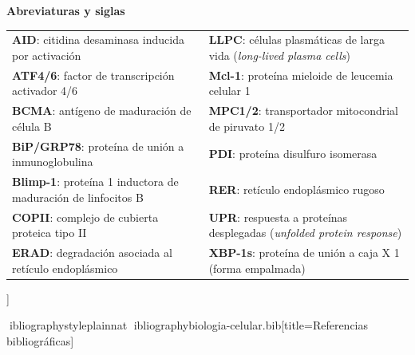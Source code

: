\documentclass[spanish,letterpaper,oneside]{article}
\begin{document}
{  {\fontsize{8.5}{10.5}\selectfont\bfseries\color{uanlblue} Abreviaturas y siglas}\\[0.04cm]
  {\fontsize{7.5}{9.5}\selectfont
  \begin{tabular*}{\textwidth}{@{\extracolsep{\fill}}ll@{}}
  \textbf{AID}: citidina desaminasa inducida por activación & \textbf{LLPC}: células plasmáticas de larga vida (\emph{long-lived plasma cells})\\
  \textbf{ATF4/6}: factor de transcripción activador 4/6 & \textbf{Mcl-1}: proteína mieloide de leucemia celular 1\\
  \textbf{BCMA}: antígeno de maduración de célula B & \textbf{MPC1/2}: transportador mitocondrial de piruvato 1/2\\
  \textbf{BiP/GRP78}: proteína de unión a inmunoglobulina & \textbf{PDI}: proteína disulfuro isomerasa\\
  \textbf{Blimp-1}: proteína 1 inductora de maduración de linfocitos B & \textbf{RER}: retículo endoplásmico rugoso\\
  \textbf{COPII}: complejo de cubierta proteica tipo II & \textbf{UPR}: respuesta a proteínas desplegadas (\emph{unfolded protein response})\\
  \textbf{ERAD}: degradación asociada al retículo endoplásmico & \textbf{XBP-1s}: proteína de unión a caja X 1 (forma empalmada)
  \end{tabular*}
  }
  \vspace{0.15cm}
}]



\newpage
ibliographystyle{plainnat}
ibliography{biologia-celular.bib}[title={Referencias bibliográficas}]
\end{document}
